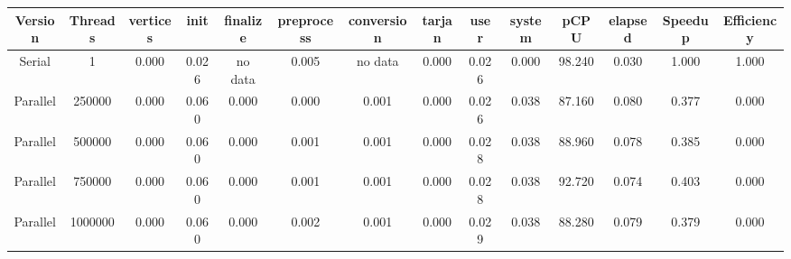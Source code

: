 \begin{tabular}{|c|c|c|c|c|c|c|c|c|c|c|c|c|c|}
\toprule
 Version &  Threads &    vertices &  init & finalize &  preprocess & conversion &  tarjan &  user &  system &   pCPU &  elapsed &  Speedup &  Efficiency \\
\midrule
  Serial &        1 &    0.000 & 0.026 &  no data &       0.005 &    no data &   0.000 & 0.026 &   0.000 & 98.240 &    0.030 &    1.000 &       1.000 \\
Parallel &   250000 &    0.000 & 0.060 &    0.000 &       0.000 &      0.001 &   0.000 & 0.026 &   0.038 & 87.160 &    0.080 &    0.377 &       0.000 \\
Parallel &   500000 &    0.000 & 0.060 &    0.000 &       0.001 &      0.001 &   0.000 & 0.028 &   0.038 & 88.960 &    0.078 &    0.385 &       0.000 \\
Parallel &   750000 &    0.000 & 0.060 &    0.000 &       0.001 &      0.001 &   0.000 & 0.028 &   0.038 & 92.720 &    0.074 &    0.403 &       0.000 \\
Parallel &  1000000 &    0.000 & 0.060 &    0.000 &       0.002 &      0.001 &   0.000 & 0.029 &   0.038 & 88.280 &    0.079 &    0.379 &       0.000 \\
\bottomrule
\end{tabular}
